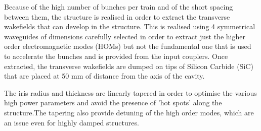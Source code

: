 Because of the high number of bunches per train and of the short spacing between them, the structure is realised in order to extract the transverse wakefields that can develop in the structure. This is realised using 4 symmetrical waveguides of dimensions carefully selected in order to extract just the higher order electromagnetic modes (HOMs) but not the fundamental one that is used to accelerate the bunches and is provided from the input couplers. Once extracted, the transverse wakefields are dumped on tips of Silicon Carbide (SiC) that are placed at 50 mm of distance from the axis of the cavity.

The iris radius and thickness are linearly tapered in order to optimise the various high power parameters and avoid the presence of 'hot spots' along the structure.The tapering also provide detuning of the high order modes, which are an issue even for highly damped structures.





